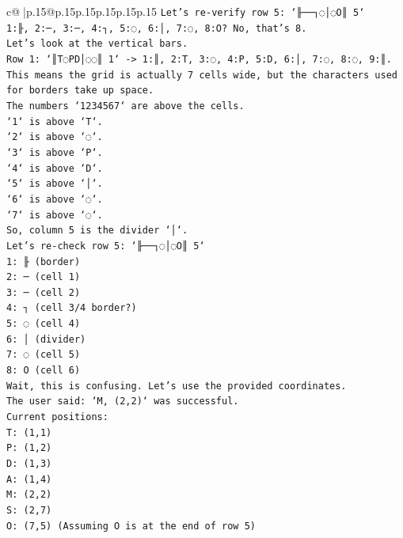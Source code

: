 \documentclass{article}
\begin{document}
{\begin{supertabular}{c@{$\;$}|p{.15\linewidth}@{}p{.15\linewidth}p{.15\linewidth}p{.15\linewidth}p{.15\linewidth}p{.15\linewidth}}
{{{\texttt{Let's re{-}verify row 5: `╟──┐◌│◌O║ 5`} \\
\texttt{1:╟, 2:─, 3:─, 4:┐, 5:◌, 6:│, 7:◌, 8:O? No, that's 8.} \\
\texttt{Let's look at the vertical bars.} \\
\texttt{Row 1: `║T◌PD│◌◌║ 1` {-}> 1:║, 2:T, 3:◌, 4:P, 5:D, 6:│, 7:◌, 8:◌, 9:║.} \\
\texttt{This means the grid is actually 7 cells wide, but the characters used for borders take up space.} \\
\texttt{The numbers `1234567` are above the cells.} \\
\texttt{`1` is above `T`.} \\
\texttt{`2` is above `◌`.} \\
\texttt{`3` is above `P`.} \\
\texttt{`4` is above `D`.} \\
\texttt{`5` is above `│`.} \\
\texttt{`6` is above `◌`.} \\
\texttt{`7` is above `◌`.} \\
\texttt{So, column 5 is the divider `│`.} \\
\texttt{Let's re{-}check row 5: `╟──┐◌│◌O║ 5`} \\
\texttt{1: ╟ (border)} \\
\texttt{2: ─ (cell 1)} \\
\texttt{3: ─ (cell 2)} \\
\texttt{4: ┐ (cell 3/4 border?)} \\
\texttt{5: ◌ (cell 4)} \\
\texttt{6: │ (divider)} \\
\texttt{7: ◌ (cell 5)} \\
\texttt{8: O (cell 6)} \\
\texttt{Wait, this is confusing. Let's use the provided coordinates.} \\
\texttt{The user said: `M, (2,2)` was successful.} \\
\texttt{Current positions:} \\
\texttt{T: (1,1)} \\
\texttt{P: (1,2)} \\
\texttt{D: (1,3)} \\
\texttt{A: (1,4)} \\
\texttt{M: (2,2)} \\
\texttt{S: (2,7)} \\
\texttt{O: (7,5) (Assuming O is at the end of row 5)} \\
\\ 
}}}
\end{supertabular}}
\end{document}
